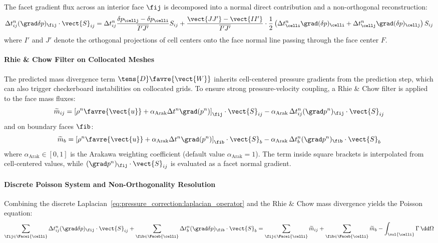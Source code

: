 The facet gradient flux across an interior face $\fij$ is decomposed into a normal direct
contribution and a non-orthogonal reconstruction:
\begin{equation}
  \Delta t_{ij}^n (\grad \delta p)_{\fij} \cdot \vect{S}_{ij}
  = \Delta t_{ij}^n \frac{\delta p_\cellj - \delta p_\celli}{\overline{I'J'}} S_{ij}
  + \frac{\vect{JJ'} - \vect{II'}}{\overline{I'J'}} \cdot \frac{1}{2}
  \left( \Delta t_\celli^n \grad(\delta p)_\celli + \Delta t_\cellj^n \grad(\delta p)_\cellj \right) S_{ij}
  \label{eq:pressure_correction:face_flux_decomp}
\end{equation}
where $I'$ and $J'$ denote the orthogonal projections of cell centers onto the face
normal line passing through the face center $F$.

\paragraph{Rhie \& Chow Filter on Collocated Meshes}
The predicted mass divergence term $\tens{D} \favre{\vect{W}}$ inherits cell-centered
pressure gradients from the prediction step, which can also trigger checkerboard
instabilities on collocated grids.
To ensure strong pressure-velocity coupling, a Rhie \& Chow filter is applied to the
face mass fluxes:
\begin{equation}
  \widetilde{m}_{ij} = \left[ \rho^n \favre{\vect{u}} + \alpha_{\text{Arak}} \Delta t^n \grad(p^n) \right]_{\fij} \cdot \vect{S}_{ij}
  - \alpha_{\text{Arak}} \, \Delta t_{ij}^n (\grad p^n)_{\fij} \cdot \vect{S}_{ij}
  \label{eq:pressure_correction:rhie_chow_interior}
\end{equation}
and on boundary faces $\fib$:
\begin{equation}
  \widetilde{m}_{b} = \left[ \rho^n \favre{\vect{u}} + \alpha_{\text{Arak}} \Delta t^n \grad(p^n) \right]_{\fib} \cdot \vect{S}_{b}
  - \alpha_{\text{Arak}} \, \Delta t_{b}^n (\grad p^n)_{\fib} \cdot \vect{S}_{b}
  \label{eq:pressure_correction:rhie_chow_boundary}
\end{equation}
where $\alpha_{\text{Arak}} \in [0, 1]$ is the Arakawa weighting coefficient
(default value $\alpha_{\text{Arak}} = 1$).
The term inside square brackets is interpolated from cell-centered values, while
$(\grad p^n)_{\fij} \cdot \vect{S}_{ij}$ is evaluated as a facet normal gradient.

\paragraph{Discrete Poisson System and Non-Orthogonality Resolution}
Combining the discrete Laplacian~\eqref{eq:pressure_correction:laplacian_operator}
and the Rhie \& Chow mass divergence yields the Poisson equation:
\begin{equation}
  \sum_{\fij \in \Facei{\celli}} \Delta t_{ij}^n (\grad \delta p)_{\fij} \cdot \vect{S}_{ij}
  + \sum_{\fib \in \Faceb{\celli}} \Delta t_{b}^n (\grad \delta p)_{\fib} \cdot \vect{S}_{b}
  = \sum_{\fij \in \Facei{\celli}} \widetilde{m}_{ij} + \sum_{\fib \in \Faceb{\celli}} \widetilde{m}_{b}
  - \int_{\vol{\celli}} \Gamma \, \dd \Omega
  \label{eq:pressure_correction:assembled_poisson}
\end{equation}

